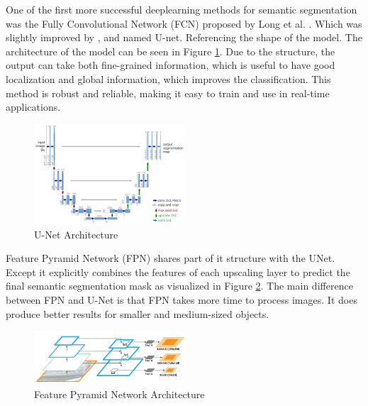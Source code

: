 One of the first more successful deeplearning methods for semantic segmentation was the Fully Convolutional Network (FCN) proposed by Long et al. \cite{long2015fully}. Which was slightly improved by \cite{ronneberger2015u}, and named U-net. Referencing the shape of the model. The architecture of the model can be seen in Figure \ref{fig:unet-architecture}. Due to the structure, the output can take both fine-grained information, which is useful to have good localization and global information, which improves the classification. This method is robust and reliable, making it easy to train and use in real-time applications.
\begin{figure}[ht]
    \centering
    \includegraphics[width=0.5\textwidth]{figures/unet-architecture.png}
    \caption{U-Net Architecture \cite{ronneberger2015u}}
    \label{fig:unet-architecture}
\end{figure}

Feature Pyramid Network (FPN) \cite{lin2017feature} shares part of it structure with the UNet. Except it explicitly combines the features of each upscaling layer to predict the final semantic segmentation mask as visualized in Figure \ref{fig:fpn-architecture}. The main difference between FPN and U-Net is that FPN takes more time to process images. It does produce better results for smaller and medium-sized objects.

\begin{figure}[ht]
    \centering
    \includegraphics[width=0.5\textwidth]{figures/fpn-architecture.png}
    \caption{Feature Pyramid Network Architecture \cite{lin2017feature}}
    \label{fig:fpn-architecture}
\end{figure}

